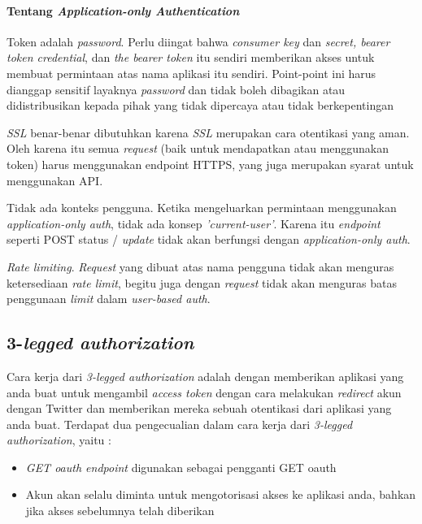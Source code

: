 \paragraph{Tentang \textit{Application-only Authentication}}
Token adalah \textit{password}. Perlu diingat bahwa \textit{consumer key} dan \textit{secret, bearer token credential}, dan \textit{the bearer token} itu sendiri memberikan akses untuk membuat permintaan atas nama aplikasi itu sendiri. Point-point ini harus dianggap sensitif layaknya \textit{password} dan tidak boleh dibagikan atau didistribusikan kepada pihak yang tidak dipercaya atau tidak berkepentingan

\textit{SSL} benar-benar dibutuhkan karena \textit{SSL} merupakan cara otentikasi yang aman. Oleh karena itu semua \textit{request} (baik untuk mendapatkan atau menggunakan token) harus menggunakan endpoint HTTPS, yang juga merupakan syarat untuk menggunakan API.

Tidak ada konteks pengguna. Ketika mengeluarkan permintaan menggunakan \textit{application-only auth}, tidak ada konsep \textit{'current-user'}. Karena itu \textit{endpoint} seperti POST status / \textit{update} tidak akan berfungsi dengan \textit{application-only auth}.

\textit{Rate limiting}. \textit{Request} yang dibuat atas nama pengguna tidak akan menguras ketersediaan \textit{rate limit}, begitu juga dengan \textit{request} tidak akan menguras batas penggunaan \textit{limit} dalam \textit{user-based auth}.


\subsection{3-\textit{legged authorization}}
Cara kerja dari \textit{3-legged authorization} adalah dengan memberikan aplikasi yang anda buat untuk mengambil \textit{access token} dengan cara melakukan \textit{redirect} akun dengan Twitter dan memberikan mereka sebuah otentikasi dari aplikasi yang anda buat. Terdapat dua pengecualian dalam cara kerja dari \textit{3-legged authorization}, yaitu :

\begin{itemize}
	\item \textit{GET oauth endpoint} digunakan sebagai pengganti GET oauth
	\item Akun akan selalu diminta untuk mengotorisasi akses ke aplikasi anda, bahkan jika akses sebelumnya telah diberikan
\end{itemize}

